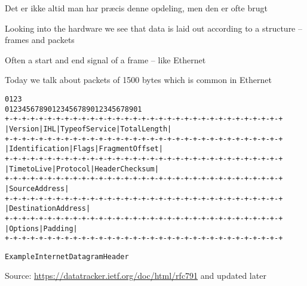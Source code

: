 \documentclass[Screen16to9,17pt]{foils}
\begin{document}

\centerline{Det er ikke altid man har præcis denne opdeling, men den er ofte brugt}





\begin{list1}
\item Looking into the hardware we see that data is laid out according to a structure -- frames and packets
\item Often a start and end signal of a frame -- like Ethernet
\item Today we talk about packets of 1500 bytes which is common in Ethernet
\end{list1}




\begin{alltt}\footnotesize
    0                   1                   2                   3
    0 1 2 3 4 5 6 7 8 9 0 1 2 3 4 5 6 7 8 9 0 1 2 3 4 5 6 7 8 9 0 1
   +-+-+-+-+-+-+-+-+-+-+-+-+-+-+-+-+-+-+-+-+-+-+-+-+-+-+-+-+-+-+-+-+
   |Version|  IHL  |Type of Service|          Total Length         |
   +-+-+-+-+-+-+-+-+-+-+-+-+-+-+-+-+-+-+-+-+-+-+-+-+-+-+-+-+-+-+-+-+
   |         Identification        |Flags|      Fragment Offset    |
   +-+-+-+-+-+-+-+-+-+-+-+-+-+-+-+-+-+-+-+-+-+-+-+-+-+-+-+-+-+-+-+-+
   |  Time to Live |    Protocol   |         Header Checksum       |
   +-+-+-+-+-+-+-+-+-+-+-+-+-+-+-+-+-+-+-+-+-+-+-+-+-+-+-+-+-+-+-+-+
   |                       Source Address                          |
   +-+-+-+-+-+-+-+-+-+-+-+-+-+-+-+-+-+-+-+-+-+-+-+-+-+-+-+-+-+-+-+-+
   |                    Destination Address                        |
   +-+-+-+-+-+-+-+-+-+-+-+-+-+-+-+-+-+-+-+-+-+-+-+-+-+-+-+-+-+-+-+-+
   |                    Options                    |    Padding    |
   +-+-+-+-+-+-+-+-+-+-+-+-+-+-+-+-+-+-+-+-+-+-+-+-+-+-+-+-+-+-+-+-+

                    Example Internet Datagram Header
\end{alltt}
Source: \url{https://datatracker.ietf.org/doc/html/rfc791} and updated later
\end{document}
